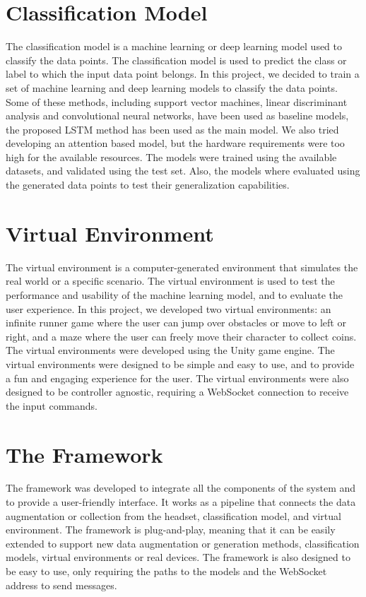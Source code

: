 \section{Classification Model}
The classification model is a machine learning or deep learning model used to classify the data points.
The classification model is used to predict the class or label to which the input data point belongs.
In this project, we decided to train a set of machine learning and deep learning models to classify the data points.
Some of these methods, including support vector machines, linear discriminant analysis and convolutional neural networks, have been used as baseline models, the proposed LSTM method has been used as the main model.
We also tried developing an attention based model, but the hardware requirements were too high for the available resources.
The models were trained using the available datasets, and validated using the test set.
Also, the models where evaluated using the generated data points to test their generalization capabilities.

\section{Virtual Environment}
The virtual environment is a computer-generated environment that simulates the real world or a specific scenario.
The virtual environment is used to test the performance and usability of the machine learning model, and to evaluate the user experience.
In this project, we developed two virtual environments: an infinite runner game where the user can jump over obstacles or move to left or right, and a maze where the user can freely move their character to collect coins.
The virtual environments were developed using the Unity game engine.
The virtual environments were designed to be simple and easy to use, and to provide a fun and engaging experience for the user.
The virtual environments were also designed to be controller agnostic, requiring a WebSocket connection to receive the input commands.

\section{The Framework}
The framework was developed to integrate all the components of the system and to provide a user-friendly interface.
It works as a pipeline that connects the data augmentation or collection from the headset, classification model, and virtual environment.
The framework is plug-and-play, meaning that it can be easily extended to support new data augmentation or generation methods, classification models, virtual environments or real devices.
The framework is also designed to be easy to use, only requiring the paths to the models and the WebSocket address to send messages.